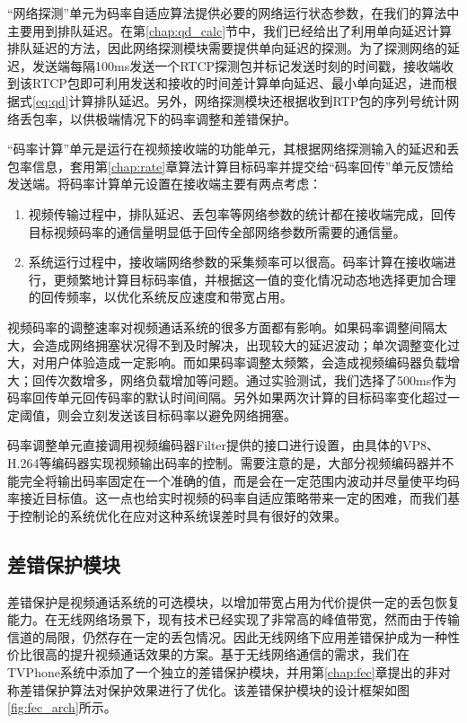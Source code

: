     ``网络探测''单元为码率自适应算法提供必要的网络运行状态参数，在我们的算法中主要用到排队延迟。在第\ref{chap:qd_calc}节中，我们已经给出了利用单向延迟计算排队延迟的方法，因此网络探测模块需要提供单向延迟的探测。为了探测网络的延迟，发送端每隔100ms发送一个RTCP探测包并标记发送时刻的时间戳，接收端收到该RTCP包即可利用发送和接收的时间差计算单向延迟、最小单向延迟，进而根据式\ref{eq:qd}计算排队延迟。另外，网络探测模块还根据收到RTP包的序列号统计网络丢包率，以供极端情况下的码率调整和差错保护。

    ``码率计算''单元是运行在视频接收端的功能单元，其根据网络探测输入的延迟和丢包率信息，套用第\ref{chap:rate}章算法计算目标码率并提交给``码率回传''单元反馈给发送端。将码率计算单元设置在接收端主要有两点考虑：
    \begin{enumerate}
        \item 视频传输过程中，排队延迟、丢包率等网络参数的统计都在接收端完成，回传目标视频码率的通信量明显低于回传全部网络参数所需要的通信量。
        \item 系统运行过程中，接收端网络参数的采集频率可以很高。码率计算在接收端进行，更频繁地计算目标码率值，并根据这一值的变化情况动态地选择更加合理的回传频率，以优化系统反应速度和带宽占用。
    \end{enumerate}
    视频码率的调整速率对视频通话系统的很多方面都有影响。如果码率调整间隔太大，会造成网络拥塞状况得不到及时解决，出现较大的延迟波动；单次调整变化过大，对用户体验造成一定影响。而如果码率调整太频繁，会造成视频编码器负载增大；回传次数增多，网络负载增加等问题。通过实验测试，我们选择了500ms作为码率回传单元回传码率的默认时间间隔。另外如果两次计算的目标码率变化超过一定阈值，则会立刻发送该目标码率以避免网络拥塞。

    码率调整单元直接调用视频编码器Filter提供的接口进行设置，由具体的VP8、H.264等编码器实现视频输出码率的控制。需要注意的是，大部分视频编码器并不能完全将输出码率固定在一个准确的值，而是会在一定范围内波动并尽量使平均码率接近目标值。这一点也给实时视频的码率自适应策略带来一定的困难，而我们基于控制论的系统优化在应对这种系统误差时具有很好的效果。


\subsection{差错保护模块}
差错保护是视频通话系统的可选模块，以增加带宽占用为代价提供一定的丢包恢复能力。在无线网络场景下，现有技术已经实现了非常高的峰值带宽，然而由于传输信道的局限，仍然存在一定的丢包情况。因此无线网络下应用差错保护成为一种性价比很高的提升视频通话效果的方案。基于无线网络通信的需求，我们在TVPhone系统中添加了一个独立的差错保护模块，并用第\ref{chap:fec}章提出的非对称差错保护算法对保护效果进行了优化。该差错保护模块的设计框架如图\ref{fig:fec_arch}所示。

